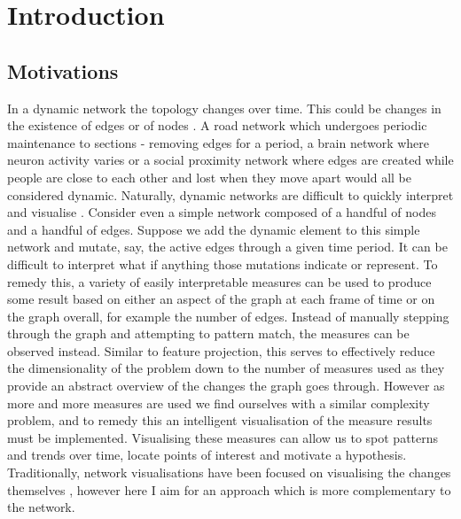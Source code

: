 
\chapter{Introduction}
\label{chap:introduction}
\ifpdf
    \graphicspath{{Introduction/Figures/PNG/}{Introduction/Figures/PDF/}{Introduction/Figures/}}
\else
    \graphicspath{{Introduction/Figures/EPS/}{Introduction/Figures/}}
\fi




\section{Motivations}
\label{motivations}
In a dynamic network the topology changes over time. This could be changes in the existence of edges or of %
nodes \cite{itdn}. A road network which undergoes periodic maintenance to sections - removing edges for a period, a brain network where neuron activity varies or a social proximity network where edges are created while people are close to each other and lost when they move apart would all be considered dynamic.
Naturally, dynamic networks are difficult to quickly interpret and visualise \cite{iddps}. Consider even a simple network composed of a handful of nodes and a handful of edges. Suppose we add the dynamic element to this simple network and mutate, say, the active edges through a given time period. It can be difficult to interpret what if anything those mutations indicate or represent.  To remedy this, a variety of easily interpretable measures can be used to produce some result based on either an aspect of the graph at each frame of time or on the graph overall, for example the number of edges. Instead of manually stepping through the graph and attempting to pattern match, the measures can be observed instead. Similar to feature projection, this serves to effectively reduce the dimensionality \cite{wikidimred} of the problem down to the number of measures used as they provide an abstract overview of the changes the graph goes through. However as more and more measures are used we find ourselves with a similar complexity problem, and to remedy this an intelligent visualisation of the measure results must be implemented. Visualising these measures can allow us to spot patterns and trends over time, locate points of interest and motivate a hypothesis. Traditionally, network visualisations have been focused on visualising the changes themselves \cite{tsotaivg}, however here I aim for an approach which is more complementary to the network.

